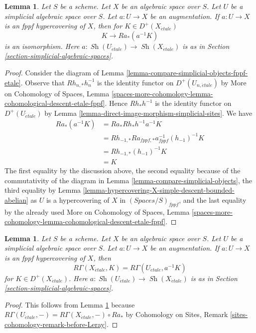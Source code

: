 \documentclass{stacks-project}
\theoremstyle{plain}
\newtheorem{lemma}[subsection]{Lemma}
\theoremstyle{definition}
\theoremstyle{remark}
\numberwithin{equation}{subsection}
\def\Sh{\mathop{\mathit{Sh}}\nolimits}
\def\etale{{\acute{e}tale}}
\begin{document}
\begin{lemma}
\label{lemma-cohomological-descent-for-fppf-hypercovering}
Let $S$ be a scheme. Let $X$ be an algebraic space over $S$.
Let $U$ be a simplicial algebraic space over $S$. Let $a : U \to X$
be an augmentation. If $a : U \to X$ is an fppf hypercovering of $X$,
then for $K \in D^+(X_\etale)$
$$
K \to Ra_*(a^{-1}K)
$$
is an isomorphism. Here $a : \Sh(U_\etale) \to \Sh(X_\etale)$
is as in Section \ref{section-simplicial-algebraic-spaces}.
\end{lemma}

\begin{proof}
Consider the diagram of Lemma \ref{lemma-compare-simplicial-objects-fppf-etale}.
Observe that $Rh_{n, *}h_n^{-1}$ is the identity functor
on $D^+(U_{n, \etale})$ by
More on Cohomology of Spaces, Lemma
\ref{spaces-more-cohomology-lemma-cohomological-descent-etale-fppf}.
Hence $Rh_*h^{-1}$ is the identity functor on
$D^+(U_\etale)$ by
Lemma \ref{lemma-direct-image-morphism-simplicial-sites}.
We have
\begin{align*}
Ra_*(a^{-1}K)
& =
Ra_*Rh_*h^{-1}a^{-1}K \\
& =
Rh_{-1, *}Ra_{fppf, *}a_{fppf}^{-1}(h_{-1})^{-1}K \\
& =
Rh_{-1, *}(h_{-1})^{-1}K \\
& =
K
\end{align*}
The first equality by the discussion above, the second equality
because of the commutativity of the diagram in
Lemma \ref{lemma-compare-simplicial-objects}, the third equality by
Lemma \ref{lemma-hypercovering-X-simple-descent-bounded-abelian}
as $U$ is a hypercovering of $X$ in $(\textit{Spaces}/S)_{fppf}$,
and the last equality by the already used
More on Cohomology of Spaces, Lemma
\ref{spaces-more-cohomology-lemma-cohomological-descent-etale-fppf}.
\end{proof}

\begin{lemma}
\label{lemma-compute-via-fppf-hypercovering}
Let $S$ be a scheme. Let $X$ be an algebraic space over $S$.
Let $U$ be a simplicial algebraic space over $S$. Let $a : U \to X$
be an augmentation. If $a : U \to X$ is an fppf hypercovering of $X$, then
$$
R\Gamma(X_\etale, K) = R\Gamma(U_\etale, a^{-1}K)
$$
for $K \in D^+(X_\etale)$. Here $a : \Sh(U_\etale) \to \Sh(X_\etale)$
is as in Section \ref{section-simplicial-algebraic-spaces}.
\end{lemma}

\begin{proof}
This follows from
Lemma \ref{lemma-cohomological-descent-for-fppf-hypercovering}
because $R\Gamma(U_\etale, -) = R\Gamma(X_\etale, -) \circ Ra_*$ by
Cohomology on Sites, Remark \ref{sites-cohomology-remark-before-Leray}.
\end{proof}
\end{document}
